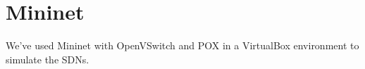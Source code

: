 \chapter{Mininet}

We've used Mininet with OpenVSwitch and
POX in a VirtualBox environment to simulate the
\acp{SDN}.

